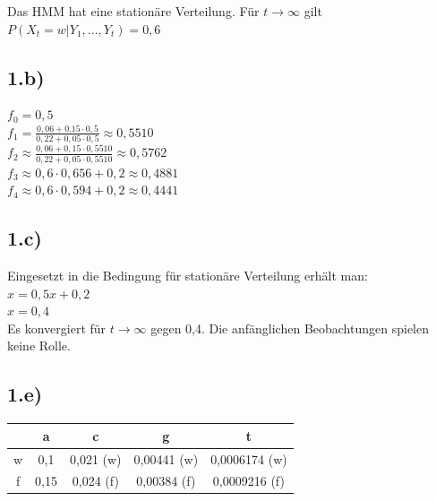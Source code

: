 \documentclass[a4paper]{article}
\begin{document}
Das HMM hat eine stationäre Verteilung. Für $t\rightarrow \infty$ gilt\\
$ P(X_t=w|Y_1,...,Y_t)=0,6$
\subsection*{1.b)}
$f_0 = 0,5$\\
$f_1=\frac{0,06+0.15\cdot 0,5}{0,22+0,05\cdot 0,5} \approx 0,5510$\\
$f_2\approx \frac{0,06+0,15\cdot 0,5510}{0,22+0,05\cdot 0,5510}\approx 0,5762$\\
$f_3\approx 0,6\cdot 0,656 + 0,2 \approx 0,4881$\\
$f_4\approx 0,6\cdot 0,594 + 0,2 \approx 0,4441$\\

\subsection*{1.c)}
Eingesetzt in die Bedingung für stationäre Verteilung erhält man:\\
$x=0,5x+0,2$\\
$x=0,4$\\
Es konvergiert für $t\rightarrow \infty$ gegen 0,4. Die anfänglichen Beobachtungen spielen keine Rolle.

\subsection*{1.e)}
\begin{tabular}{c|cccc}
    & a 		& c 			& g 			& t 			\\
\hline
w	& 0,1		& 0,021 (w)		& 0,00441 (w)		& 0,0006174 (w)	\\
f 	& 0,15		& 0,024 (f)		& 0,00384 (f)		& 0,0009216 (f)	\\
\end{tabular}
\end{document}
